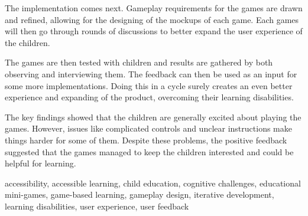 The implementation comes next. Gameplay requirements for the games are drawn and refined, allowing for the designing of the mockups of each game. Each games will then go through rounds of discussions to better expand the user experience of the children.

The games are then tested with children and results are gathered by both observing and interviewing them. The feedback can then be used as an input for some more implementations. Doing this in a cycle surely creates an even better experience and expanding of the product, overcoming their learning disabilities.

The key findings showed that the children are generally excited about playing the games. However, issues like complicated controls and unclear instructions make things harder for some of them. Despite these problems, the positive feedback suggested that the games managed to keep the children interested and could be helpful for learning.


\begin{keywords}
	accessibility, accessible learning, child education, cognitive challenges, educational mini-games, game-based learning, gameplay design, iterative development, learning disabilities, user experience, user feedback
\end{keywords}
	

